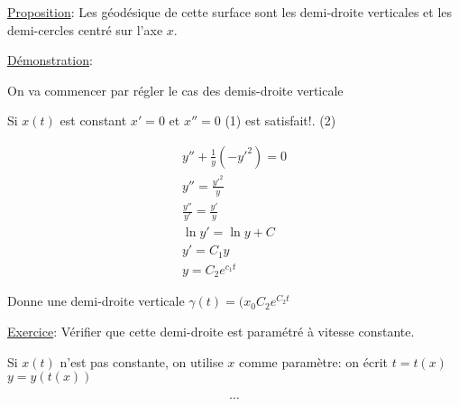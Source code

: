 \underline{Proposition}: Les géodésique de cette surface sont les demi-droite verticales et les demi-cercles centré sur l'axe $x$.

\underline{Démonstration}: 

On va commencer par régler le cas des demis-droite verticale

Si $x(t)$ est constant $x'=0$ et $x''=0$ (1) est satisfait!. (2)

\begin{gather*}
	y'' + \frac{1}{y} (-y'^2) = 0\\
	y'' = \frac{y'^2}{y} \\
	\frac{y''}{y'} = \frac{y'}{y} \\
	\ln y'  = \ln y + C\\
	y' = C_1 y\\
	y = C_2 e^{c_1 t} 
\end{gather*}

Donne une demi-droite verticale $\gamma(t) = (x_{0} C_2 e^{C_2 t}$ 

\underline{Exercice}: Vérifier que cette demi-droite est paramétré à vitesse constante.

Si $x(t)$ n'est pas constante, on utilise $x$ comme paramètre: on écrit $t = t(x)$ $y = y(t(x))$   


$$\dotsb$$ 


